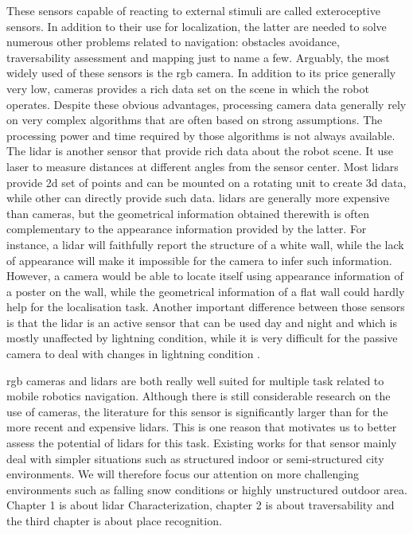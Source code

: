 These sensors capable of reacting to external stimuli are called exteroceptive sensors. In addition to their use for localization, the latter are needed to solve numerous other problems related to navigation: obstacles avoidance, traversability assessment and mapping just to name a few. Arguably, the most widely used of these sensors is the \gls*{rgb} camera. In addition to its price generally very low, cameras provides a rich data set on the scene in which the robot operates. Despite these obvious advantages, processing camera data generally rely on very complex algorithms that are often based on strong assumptions. The processing power and time required by those algorithms is not always available. The \gls*{lidar} is another sensor that provide rich data about the robot scene. It use laser to measure distances at different angles from the sensor center. Most \gls*{lidar}s provide \gls*{2d} set of points and can be mounted on a rotating unit to create \gls*{3d} data, while other can directly provide such data. \gls*{lidar}s are generally more expensive than cameras, but the geometrical information obtained therewith is often complementary to the appearance information provided by the latter. For instance, a \gls*{lidar} will faithfully report the structure of a white wall, while the lack of appearance will make it impossible for the camera to infer such information. However, a camera would be able to locate itself using appearance information of a poster on the wall, while the geometrical information of a flat wall could hardly help for the localisation task. Another important difference between those sensors is that the \gls*{lidar} is an active sensor that can be used day and night and which is mostly unaffected by lightning condition, while it is very difficult for the passive camera to deal with changes in lightning condition .

\gls*{rgb} cameras and \gls*{lidar}s are both really well suited for multiple task related to mobile robotics navigation. Although there is still considerable research on the use of cameras, the literature for this sensor is significantly larger than for the more recent and expensive \gls*{lidar}s. This is one reason that motivates us to better assess the potential of \gls*{lidar}s for this task. Existing works for that sensor mainly deal with simpler situations such as structured indoor or semi-structured city environments. We will therefore focus our attention on more challenging environments such as falling snow conditions or highly unstructured outdoor area.  Chapter 1 is about \gls*{lidar} Characterization, chapter 2 is about traversability and the third chapter is about place recognition.
